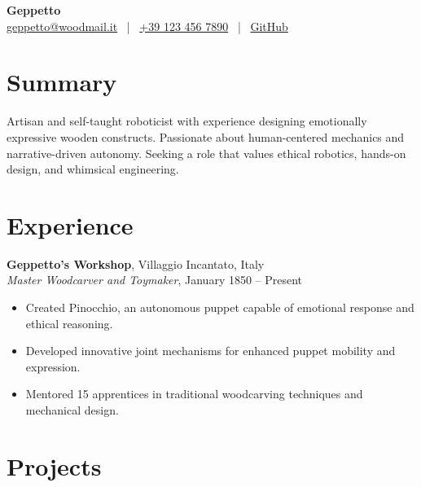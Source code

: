 \documentclass[10pt]{article}
\begin{document}
\begin{center}
    {\Large\bfseries{Geppetto}}\\[0.2em]
    {\normalsize
        \href{mailto:geppetto@woodmail.it}{geppetto@woodmail.it} ~|~
        \href{tel:+39 123 456 7890}{+39 123 456 7890} ~|~
        \href{https://github.com/geppetto-works}{GitHub}
    }
\end{center}

\vspace{0.5em}


\section*{Summary}

Artisan and self-taught roboticist with experience designing emotionally expressive wooden constructs.
Passionate about human-centered mechanics and narrative-driven autonomy.
Seeking a role that values ethical robotics, hands-on design, and whimsical engineering.




\section*{Experience}

\textbf{Geppetto's Workshop}, \hfill Villaggio Incantato, Italy \\
\textit{Master Woodcarver and Toymaker}, \hfill January 1850 -- Present
\begin{itemize}[leftmargin=*, noitemsep, topsep=0.1em]

    \item Created Pinocchio, an autonomous puppet capable of emotional response and ethical reasoning.

    \item Developed innovative joint mechanisms for enhanced puppet mobility and expression.

    \item Mentored 15 apprentices in traditional woodcarving techniques and mechanical design.

\end{itemize}
\vspace{0.3em}


\section*{Projects}
\end{document}
